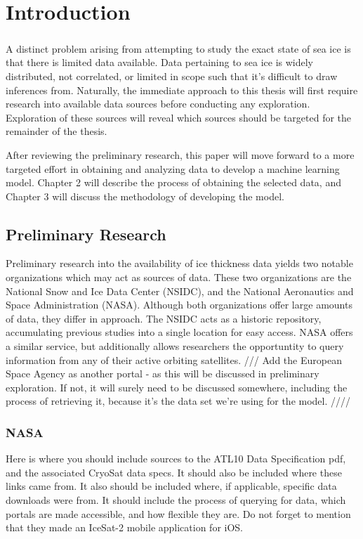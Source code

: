 \chapter{Introduction}
\label{sec:Introduction}

\paragraph{}
A distinct problem arising from attempting to study the exact state of sea ice is that there is limited data available. Data pertaining to sea ice is widely distributed, not correlated, or limited in scope such that it's difficult to draw inferences from. Naturally, the immediate approach to this thesis will first require research into available data sources before conducting any exploration. Exploration of these sources will reveal which sources should be targeted for the remainder of the thesis.

\indent After reviewing the preliminary research, this paper will move forward to a more targeted effort in obtaining and analyzing data to develop a machine learning model. Chapter 2 will describe the process of obtaining the selected data, and Chapter 3 will discuss the methodology of developing the model.
\par

\section{Preliminary Research}
Preliminary research into the availability of ice thickness data yields two notable organizations which may act as sources of data. These two organizations are the National Snow and Ice Data Center (NSIDC), and the National Aeronautics and Space Administration (NASA). Although both organizations offer large amounts of data, they differ in approach. The NSIDC acts as a historic repository, accumulating previous studies into a single location for easy access. NASA offers a similar service, but additionally allows researchers the opportuntity to query information from any of their active orbiting satellites.
/// Add the European Space Agency as another portal - as this will be discussed in preliminary exploration. If not, it will surely need to be discussed somewhere, including the process of retrieving it, because it's the data set we're using for the model.  ////

\subsection*{NASA}
Here is where you should include sources to the ATL10 Data Specification pdf, and the associated CryoSat data specs. It should also be included where these links came from. It also should be included where, if applicable, specific data downloads were from. It should include the process of querying for data, which portals are made accessible, and how flexible they are. Do not forget to mention that they made an IceSat-2 mobile application for iOS.

